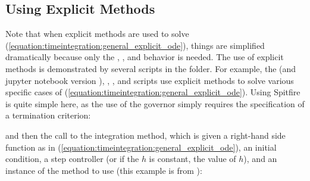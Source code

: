 \documentclass[letterpaper,10pt,english]{sphinxmanual}
\begin{document}
\subsection{Using Explicit Methods}
\label{\detokenize{timeintegration:using-explicit-methods}}
Note that when explicit methods are used to solve (\ref{equation:timeintegration:general_explicit_ode}), things are simplified dramatically because only the , , and  behavior is needed.
The use of explicit methods is demonstrated by several scripts in the  folder.
For example, the  (and jupyter notebook version ), , , and  scripts use explicit methods to solve various specific cases of (\ref{equation:timeintegration:general_explicit_ode}).
Using Spitfire is quite simple here, as the use of the governor simply requires the specification of a termination criterion:

\begin{sphinxVerbatim}[commandchars=\\\{\}]
  
  
\end{sphinxVerbatim}

and then the call to the integration method, which is given a right-hand side function as in (\ref{equation:timeintegration:general_explicit_ode}),
an initial condition, a step controller (or if the \(h\) is constant, the value of \(h\)),
and an instance of the  method to use (this example is from ):

\begin{sphinxVerbatim}[commandchars=\\\{\}]
     
\end{sphinxVerbatim}
\end{document}
